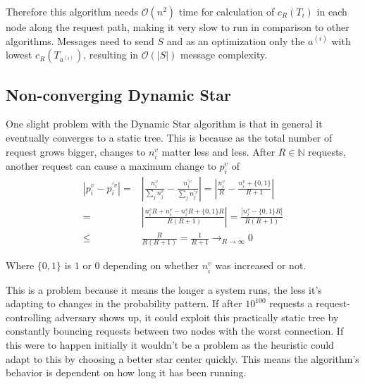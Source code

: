 \documentclass[a4paper, oneside]{discothesis}
\begin{document}
Therefore this algorithm needs $\mathcal{O}(n^2)$ time for calculation of $c_R(T_i)$ in each node along the request path, making it very slow to run in comparison to other algorithms. Messages need to send $S$ and as an optimization only the $a^{(i)}$ with lowest $c_R(T_{a^{(i)}})$, resulting in $\mathcal{O}(|S|)$ message complexity.

\subsection{Non-converging Dynamic Star}

One slight problem with the Dynamic Star algorithm is that in general it eventually converges to a static tree. This is because as the total number of request grows bigger, changes to $n_i^v$ matter less and less. After $R\in\mathbb{N}$ requests, another request can cause a maximum change to $p_i^v$ of
\begin{equation}
\begin{split}
\left|p_i^v-p_i^{'v}\right| = & \left|\frac{n_i^v}{\sum_jn_j^v}-\frac{n_i^{'v}}{\sum_jn_j^{'v}}\right| = \left|\frac{n_i^v}{R}-\frac{n_i^v+\{0,1\}}{R+1}\right| \\
= & \left|\frac{n_i^vR+n_i^v-n_i^vR+\{0,1\}R}{R(R+1)}\right| = \frac{\left|n_i^v-\{0,1\}R\right|}{R(R+1)} \\
\leq & \frac{R}{R(R+1)}=\frac{1}{R+1}\to_{R\to\infty} 0
\end{split}
\end{equation}

Where $\{0,1\}$ is $1$ or $0$ depending on whether $n_i^v$ was increased or not.

This is a problem because it means the longer a system runs, the less it's adapting to changes in the probability pattern. If after $10^{100}$ requests a request-controlling adversary shows up, it could exploit this practically static tree by constantly bouncing requests between two nodes with the worst connection. If this were to happen initially it wouldn't be a problem as the heuristic could adapt to this by choosing a better star center quickly. This means the algorithm's behavior is dependent on how long it has been running.
\end{document}
